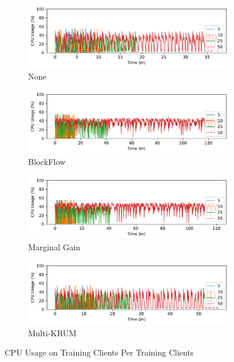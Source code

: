 \newpage

\begin{figure}[!h]
    \centering
    \begin{subfigure}[b]{0.49\textwidth}
        \centering
        \includegraphics[width=\textwidth]{graphics/clients/cpu_none_client.pdf}
        \caption{None}
    \end{subfigure}
    \hfill
    \begin{subfigure}[b]{0.49\textwidth}
        \centering
        \includegraphics[width=\textwidth]{graphics/clients/cpu_blockflow_client.pdf}
        \caption{BlockFlow}
    \end{subfigure}
    \hfill
    \begin{subfigure}[b]{0.49\textwidth}
        \centering
        \includegraphics[width=\textwidth]{graphics/clients/cpu_marginalgain_client.pdf}
        \caption{Marginal Gain}
    \end{subfigure}
    \hfill
    \begin{subfigure}[b]{0.49\textwidth}
        \centering
        \includegraphics[width=\textwidth]{graphics/clients/cpu_multikrum_client.pdf}
        \caption{Multi-KRUM}
    \end{subfigure}
    \caption{CPU Usage on Training Clients Per Training Clients}
    \label{fig:cpu_clients_degree_clients}
\end{figure}

